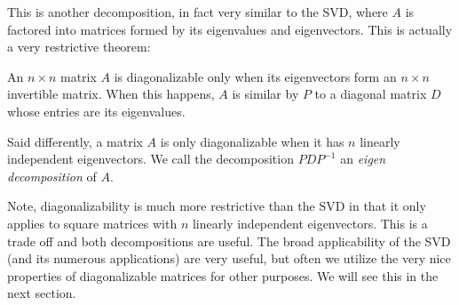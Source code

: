 \documentclass{ximera}
\begin{document}
This is another decomposition, in fact very similar to the SVD, where $A$ is factored into matrices formed by its eigenvalues and eigenvectors. This is actually a very restrictive theorem:

\begin{theorem}

  An $n\times n$ matrix $A$ is diagonalizable only when its eigenvectors form an $n\times n$ invertible matrix. When this happens, $A$ is similar by $P$ to a diagonal matrix $D$ whose entries are its eigenvalues.

  Said differently, a matrix $A$ is only diagonalizable when it has $n$ linearly independent eigenvectors. We call the decomposition $PDP^{-1}$ an \emph{eigen decomposition} of $A$.

\end{theorem}

Note, diagonalizability is much more restrictive than the SVD in that it only applies to square matrices with $n$ linearly independent eigenvectors. This is a trade off and both decompositions are useful. The broad applicability of the SVD (and its numerous applications) are very useful, but often we utilize the very nice properties of diagonalizable matrices for other purposes. We will see this in the next section. 
\end{document}
